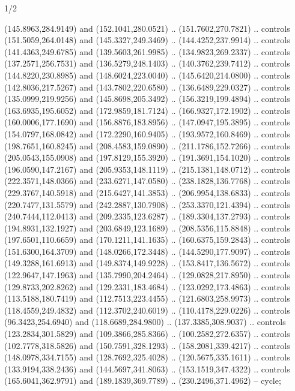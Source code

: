 \begin{flagdescription}{1/2}
\begin{scope}[xshift=0.25\flaglength,yshift=0.5\flagwidth,scale=\flagwidth/227.6]
\begin{scope}[xshift=-35mm,yshift=35.7mm,y=0.4065pt, x=0.4065pt, yscale=-1]
  (145.8963,284.9149) and (152.1041,280.0521) .. (151.7602,270.7821) .. controls
  (151.5059,264.0148) and (145.3327,249.3469) .. (144.4252,237.9914) .. controls
  (141.4363,249.6785) and (139.5603,261.9985) .. (134.9823,269.2337) .. controls
  (137.2571,256.7531) and (136.5279,248.1403) .. (140.3762,239.7412) .. controls
  (144.8220,230.8985) and (148.6024,223.0040) .. (145.6420,214.0800) .. controls
  (142.8036,217.5267) and (143.7802,220.6580) .. (136.6489,229.0327) .. controls
  (135.0999,219.9256) and (145.8698,205.3492) .. (156.3219,199.4894) .. controls
  (163.6935,195.6052) and (172.9859,181.7124) .. (166.9327,172.1902) .. controls
  (160.0006,177.1690) and (156.8876,183.8956) .. (147.0947,195.3895) .. controls
  (154.0797,168.0842) and (172.2290,160.9405) .. (193.9572,160.8469) .. controls
  (198.7651,160.8245) and (208.4583,159.0890) .. (211.1786,152.7266) .. controls
  (205.0543,155.0908) and (197.8129,155.3920) .. (191.3691,154.1020) .. controls
  (196.0590,147.2167) and (205.9353,148.1119) .. (215.1381,148.0712) .. controls
  (222.3571,148.0366) and (233.6271,147.0580) .. (238.1828,136.7768) .. controls
  (229.3767,140.5918) and (215.6427,141.3853) .. (206.9954,138.6833) .. controls
  (220.7477,131.5579) and (242.2887,130.7908) .. (253.3370,121.4394) .. controls
  (240.7444,112.0413) and (209.2335,123.6287) .. (189.3304,137.2793) .. controls
  (194.8931,132.1927) and (203.6849,123.1689) .. (208.5356,115.8848) .. controls
  (197.6501,110.6659) and (170.1211,141.1635) .. (160.6375,159.2843) .. controls
  (151.6300,164.3709) and (148.0266,172.3448) .. (144.5290,177.9097) .. controls
  (149.3288,161.6913) and (149.8374,149.9228) .. (153.8417,136.5672) .. controls
  (122.9647,147.1963) and (135.7990,204.2464) .. (129.0828,217.8950) .. controls
  (129.8733,202.8262) and (129.2331,183.4684) .. (123.0292,173.4863) .. controls
  (113.5188,180.7419) and (112.7513,223.4455) .. (121.6803,258.9973) .. controls
  (118.4559,249.4832) and (112.3702,240.6019) .. (110.4178,229.0226) .. controls
  (96.3423,254.6940) and (118.6689,284.9800) .. (137.3385,308.9037) .. controls
  (123.2834,301.5829) and (109.3866,285.8366) .. (100.2582,272.6357) .. controls
  (102.7778,318.5826) and (150.7591,328.1293) .. (158.2081,339.4217) .. controls
  (148.0978,334.7155) and (128.7692,325.4028) .. (120.5675,335.1611) .. controls
  (133.9194,338.2436) and (144.5697,341.8063) .. (153.1519,347.4322) .. controls
  (165.6041,362.9791) and (189.1839,369.7789) .. (230.2496,371.4962) -- cycle;
\end{scope}
\end{scope}
\fi
\framecode{}
\end{flagdescription}
